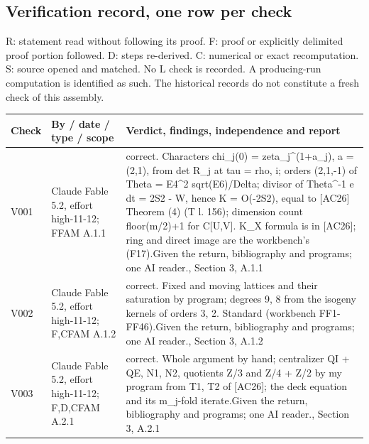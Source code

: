 \documentclass[11pt,a4paper]{article}
\theoremstyle{plain}
\theoremstyle{definition}
\begin{document}
\subsection{Verification record, one row per check}\label{app:verification}
R: statement read without following its proof. F: proof or explicitly delimited proof portion followed. D: steps re-derived. C: numerical or exact recomputation. S: source opened and matched. No L check is recorded. A producing-run computation is identified as such. The historical records do not constitute a fresh check of this assembly.
\begingroup\footnotesize\setlength{\tabcolsep}{3pt}\begin{longtable}{@{}L{.08\linewidth}L{.31\linewidth}L{.56\linewidth}@{}}
\toprule Check & By / date / type / scope & Verdict, findings, independence and report\\\midrule\endhead
V001 & Claude Fable 5.2, effort high-11-12; F\newline FAM A.1.1 & correct. Characters chi\_\allowbreak{}j(0) = zeta\_\allowbreak{}j\textasciicircum{}(1+a\_\allowbreak{}j), a = (2,1), from det R\_\allowbreak{}j at tau = rho, i; orders (2,1,-1) of Theta = E4\textasciicircum{}2 sqrt(E6)/\allowbreak{}Delta; divisor of Theta\textasciicircum{}-1 e dt = 2S2 - W, hence K = O(-2S2), equal to [AC26] Theorem (4) (T l. 156); dimension count floor(m/\allowbreak{}2)+1 for C[U,V]. K\_\allowbreak{}X formula is in [AC26]; ring and direct image are the workbench's (F17).\newline Given the return, bibliography and programs; one AI reader.\newline {}, Section 3, A.1.1\\
V002 & Claude Fable 5.2, effort high-11-12; F,C\newline FAM A.1.2 & correct. Fixed and moving lattices and their saturation by program; degrees 9, 8 from the isogeny kernels of orders 3, 2. Standard (workbench FF1-FF46).\newline Given the return, bibliography and programs; one AI reader.\newline {}, Section 3, A.1.2\\
V003 & Claude Fable 5.2, effort high-11-12; F,D,C\newline FAM A.2.1 & correct. Whole argument by hand; centralizer QI + QE, N1, N2, quotients Z/\allowbreak{}3 and Z/\allowbreak{}4 + Z/\allowbreak{}2 by my program from T1, T2 of [AC26]; the deck equation and its m\_\allowbreak{}j-fold iterate.\newline Given the return, bibliography and programs; one AI reader.\newline {}, Section 3, A.2.1\\

\end{longtable}
\end{document}
